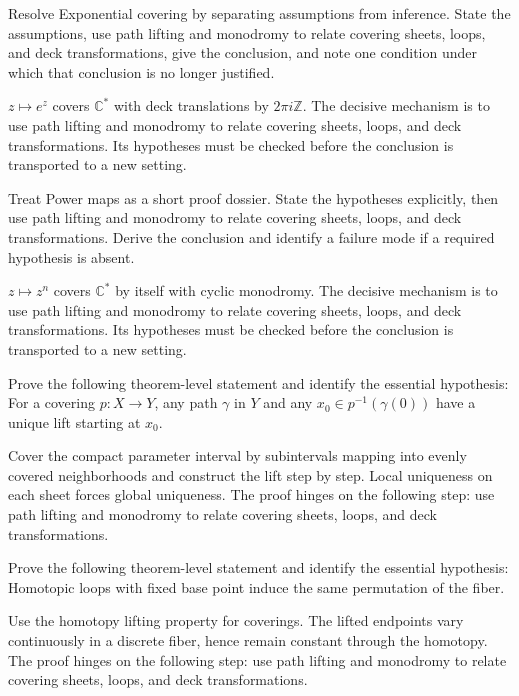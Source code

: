 \begin{problem}\label{prob:iv23-problem-07}
Resolve Exponential covering by separating assumptions from inference. State the assumptions, use path lifting and monodromy to relate covering sheets, loops, and deck transformations, give the conclusion, and note one condition under which that conclusion is no longer justified.
\end{problem}
\begin{solution}
$z\mapsto e^z$ covers $\mathbb C^*$ with deck translations by $2\pi i\mathbb Z$. The decisive mechanism is to use path lifting and monodromy to relate covering sheets, loops, and deck transformations. Its hypotheses must be checked before the conclusion is transported to a new setting.
\end{solution}

\begin{problem}\label{prob:iv23-problem-08}
Treat Power maps as a short proof dossier. State the hypotheses explicitly, then use path lifting and monodromy to relate covering sheets, loops, and deck transformations. Derive the conclusion and identify a failure mode if a required hypothesis is absent.
\end{problem}
\begin{solution}
$z\mapsto z^n$ covers $\mathbb C^*$ by itself with cyclic monodromy. The decisive mechanism is to use path lifting and monodromy to relate covering sheets, loops, and deck transformations. Its hypotheses must be checked before the conclusion is transported to a new setting.
\end{solution}

\begin{problem}\label{prob:iv23-problem-09}
Prove the following theorem-level statement and identify the essential hypothesis: For a covering $p:X\to Y$, any path $\gamma$ in $Y$ and any $x_0\in p^{-1}(\gamma(0))$ have a unique lift starting at $x_0$.
\end{problem}
\begin{solution}
Cover the compact parameter interval by subintervals mapping into evenly covered neighborhoods and construct the lift step by step. Local uniqueness on each sheet forces global uniqueness. The proof hinges on the following step: use path lifting and monodromy to relate covering sheets, loops, and deck transformations.
\end{solution}

\begin{problem}\label{prob:iv23-problem-10}
Prove the following theorem-level statement and identify the essential hypothesis: Homotopic loops with fixed base point induce the same permutation of the fiber.
\end{problem}
\begin{solution}
Use the homotopy lifting property for coverings. The lifted endpoints vary continuously in a discrete fiber, hence remain constant through the homotopy. The proof hinges on the following step: use path lifting and monodromy to relate covering sheets, loops, and deck transformations.
\end{solution}

